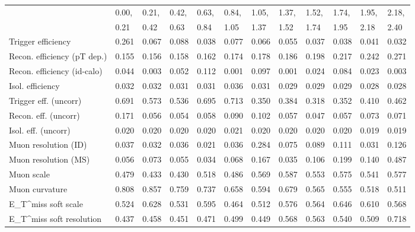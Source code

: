 \begin{tabular}{l|p{0.6cm}p{0.6cm}p{0.6cm}p{0.6cm}p{0.6cm}p{0.6cm}p{0.6cm}p{0.6cm}p{0.6cm}p{0.6cm}p{0.6cm}}
\hline
   & 0.00, & 0.21, & 0.42, & 0.63, & 0.84, & 1.05, & 1.37, & 1.52, & 1.74, & 1.95, & 2.18,  \\ 
   & 0.21 & 0.42 & 0.63 & 0.84 & 1.05 & 1.37 & 1.52 & 1.74 & 1.95 & 2.18 & 2.40  \\ 
\hline
Trigger efficiency                       & 0.261 & 0.067 & 0.088 & 0.038 & 0.077 & 0.066 & 0.055 & 0.037 & 0.038 & 0.041 & 0.032 \\
Recon. efficiency (pT dep.)              & 0.155 & 0.156 & 0.158 & 0.162 & 0.174 & 0.178 & 0.186 & 0.198 & 0.217 & 0.242 & 0.271 \\
Recon. efficiency (id-calo)              & 0.044 & 0.003 & 0.052 & 0.112 & 0.001 & 0.097 & 0.001 & 0.024 & 0.084 & 0.023 & 0.003 \\
Isol. efficiency                         & 0.032 & 0.032 & 0.031 & 0.031 & 0.036 & 0.031 & 0.029 & 0.029 & 0.029 & 0.028 & 0.028 \\
Trigger eff. (uncorr)                    & 0.691 & 0.573 & 0.536 & 0.695 & 0.713 & 0.350 & 0.384 & 0.318 & 0.352 & 0.410 & 0.462 \\
Recon. eff. (uncorr)                     & 0.171 & 0.056 & 0.054 & 0.058 & 0.090 & 0.102 & 0.057 & 0.047 & 0.057 & 0.073 & 0.071 \\
Isol. eff. (uncorr)                      & 0.020 & 0.020 & 0.020 & 0.020 & 0.021 & 0.020 & 0.020 & 0.020 & 0.020 & 0.019 & 0.019 \\
Muon resolution (ID)                     & 0.037 & 0.032 & 0.036 & 0.021 & 0.036 & 0.284 & 0.075 & 0.089 & 0.111 & 0.031 & 0.126 \\
Muon resolution (MS)                     & 0.056 & 0.073 & 0.055 & 0.034 & 0.068 & 0.167 & 0.035 & 0.106 & 0.199 & 0.140 & 0.487 \\
Muon scale                               & 0.479 & 0.433 & 0.430 & 0.518 & 0.486 & 0.569 & 0.587 & 0.553 & 0.575 & 0.541 & 0.577 \\
Muon curvature                           & 0.808 & 0.857 & 0.759 & 0.737 & 0.658 & 0.594 & 0.679 & 0.565 & 0.555 & 0.518 & 0.511 \\
E_{T}^{miss} soft scale                  & 0.524 & 0.628 & 0.531 & 0.595 & 0.464 & 0.512 & 0.576 & 0.564 & 0.646 & 0.610 & 0.568 \\
E_{T}^{miss} soft resolution             & 0.437 & 0.458 & 0.451 & 0.471 & 0.499 & 0.449 & 0.568 & 0.563 & 0.540 & 0.509 & 0.718 \\

\end{tabular}
